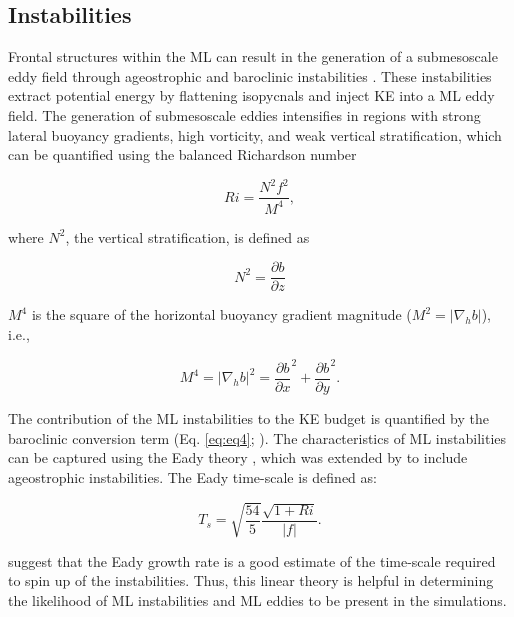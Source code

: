 \documentclass[draft]{agujournal2019}
\begin{document}
\subsection{Instabilities}

Frontal structures within the ML can result in the generation of a submesoscale eddy field through ageostrophic and baroclinic instabilities \citep{FoxKemper_eddies_2008}. These instabilities extract potential energy by flattening isopycnals and inject KE into a ML eddy field. The generation of submesoscale eddies intensifies in regions with strong lateral buoyancy gradients, high vorticity, and weak vertical stratification, which can be quantified using the balanced Richardson number
\begin{linenomath*}
\begin{equation}
  Ri = \frac{N^2f^2}{M^4},
  \label{eq:eq8}
\end{equation}
\end{linenomath*}
where $N^2$, the vertical stratification, is defined as
\begin{linenomath*}
\begin{equation}
  N^2 = \frac{\partial b}{\partial z} %
  \label{eq:eq9}
\end{equation}
\end{linenomath*}
$M^4$ is the square of the horizontal buoyancy gradient magnitude ($M^2=|\nabla_h b|$), i.e.,
\begin{linenomath*}
\begin{equation}
  M^4 = |\nabla_h b|^2 = \frac{\partial b}{\partial x}^2 + \frac{\partial b}{\partial y}^2.
  \label{eq:eq10}
\end{equation}
\end{linenomath*}

The contribution of the ML instabilities to the KE budget is quantified by the baroclinic conversion term (Eq. \ref{eq:eq4}; \citealt{Thomas_symmetric_2013}).
The characteristics of ML instabilities can be captured using the Eady theory \citep{Eady_eady_1949}, which was extended by \citet{Stone_baroclinic_1972} to include ageostrophic instabilities. The Eady time-scale is defined as:
\begin{linenomath*}
\begin{equation}
  T_s = \sqrt{\frac{54}{5}}\frac{\sqrt{1+Ri}}{|f|}.
  \label{eq:eq14}
\end{equation}
\end{linenomath*}
\citet{FoxKemper_eddies_2008} suggest that the Eady growth rate is a good estimate of the time-scale required to spin up of the instabilities. Thus, this linear theory is helpful in determining the likelihood of ML instabilities and ML eddies to be present in the simulations. 
\end{document}
